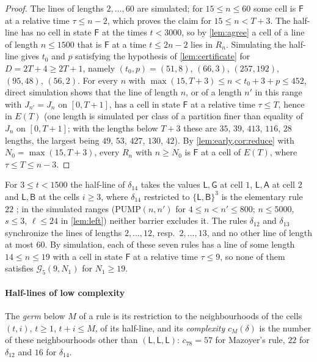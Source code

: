\documentclass[3p]{elsarticle}
\theoremstyle{definition}
\newcommand{\Lq}{\mathsf L}
\newcommand{\Gq}{\mathsf G}
\newcommand{\Aq}{\mathsf A}
\newcommand{\Bq}{\mathsf B}
\newcommand{\Fq}{\mathsf F}
\newcommand{\G}{\mathcal G}
\begin{document}
\begin{proof}
The lines of lengths $2,\dots,60$ are simulated; for $15\le n\le60$ some cell
is $\Fq$ at a relative time $\tau\le n-2$, which proves the claim for $15\le
n<T+3$. The half-line has no cell in state $\Fq$ at the times $t<3000$, so by
\cref{lem:agree} a cell of a line of length $n\le1500$ that is $\Fq$ at a time
$t\le 2n-2$ lies in $R_n$. Simulating the half-line gives $t_0$ and $p$
satisfying the hypothesis of \cref{lem:certificate} for $D=2T+4\ge2T+1$,
namely $(t_0,p)=(51,8)$, $(66,3)$, $(257,192)$, $(95,48)$, $(56,2)$. For every
$n$ with $\max(15,T+3)\le n<t_0+3+p\le452$, direct simulation shows that the
line of length $n$, or of a length $n'$ in this range with $J_{n'}=J_n$ on
$[0,T+1]$, has a cell in state $\Fq$ at a relative time $\tau\le T$, hence in
$E(T)$ (one length is simulated per class of a partition finer than equality
of $J_n$ on $[0,T+1]$; with the lengths below $T+3$ these are $35$, $39$,
$413$, $116$, $28$ lengths, the largest being $49$, $53$, $427$, $130$,
$42$). By \cref{lem:early,cor:reduce} with $N_0=\max(15,T+3)$, every $R_n$ with
$n\ge N_0$ is $\Fq$ at a cell of $E(T)$, where $\tau\le T\le n-3$.
\end{proof}


For $3\le t<1500$ the half-line of $\delta_{14}$ takes the values $\Lq,\Gq$ at
cell $1$, $\Lq,\Aq$ at cell $2$ and $\Lq,\Bq$ at the cells $i\ge3$, where
$\delta_{14}$ restricted to $\{\Lq,\Bq\}^3$ is the elementary rule $22$
\cite{Wolfram83}; in the simulated ranges ($\mathrm{PUMP}(n,n')$ for $4\le
n<n'\le800$; $n\le5000$, $s\le3$, $\ell\le24$ in \cref{lem:left}) neither
barrier excludes it. The rules $\delta_{12}$ and $\delta_{13}$ synchronize the
lines of lengths $2,\dots,12$, resp.\ $2,\dots,13$, and no other line of length
at most $60$. By simulation, each of these seven rules has a line of some
length $14\le n\le19$ with a cell in state $\Fq$ at a relative time $\tau\le9$,
so none of them satisfies $\G_5(9,N_1)$ for $N_1\ge19$.

\paragraph{Half-lines of low complexity} The \emph{germ} below $M$ of a rule is
its restriction to the neighbourhoods of the cells $(t,i)$, $t\ge1$, $t+i\le M$,
of its half-line, and its \emph{complexity} $c_M(\delta)$ is the number of
these neighbourhoods other than $(\Lq,\Lq,\Lq)$: $c_{78}=57$ for Mazoyer's
rule, $22$ for $\delta_{12}$ and $16$ for $\delta_{14}$.
\end{document}
